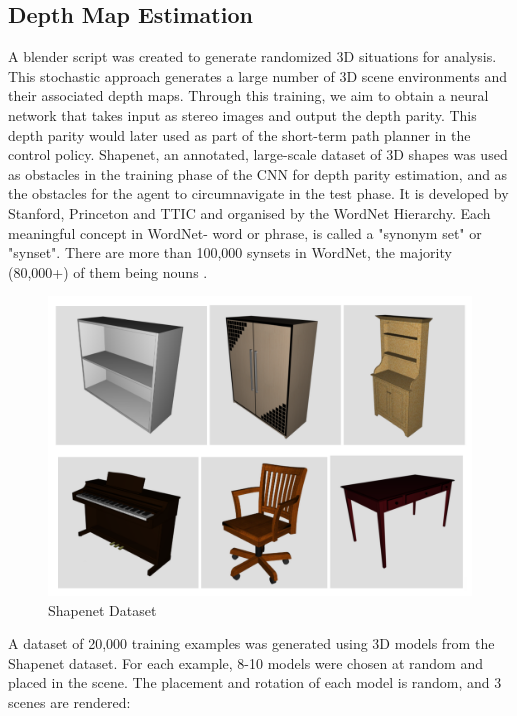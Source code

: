 \subsection{Depth Map Estimation}
A blender script was created to generate randomized 3D situations for analysis. This stochastic approach generates a large number of 3D scene environments and their associated depth maps.
Through this training, we aim to obtain a neural network that takes input as stereo images and output the depth parity. This depth parity would later used as part of the short-term path planner in the control policy.
Shapenet, an annotated, large-scale dataset of 3D shapes was used as obstacles in the training phase of the CNN for depth parity estimation, and as the obstacles for the agent to circumnavigate in the test phase. It is developed by Stanford, Princeton and TTIC and organised by the WordNet Hierarchy.
Each meaningful concept in WordNet- word or phrase, is called a "synonym set" or "synset". There are more than 100,000 synsets in WordNet, the majority (80,000+) of them being nouns .

\begin{figure}
  \includegraphics[width=\linewidth]{images/shapenet.png}
  \caption{Shapenet Dataset}
  \label{fig:boat1}
\end{figure}

A dataset of 20,000 training examples was generated using 3D models from the Shapenet dataset. For each example, 8-10 models were chosen at random and placed in the scene.
The placement and rotation of each model is random, and 3 scenes are rendered:

